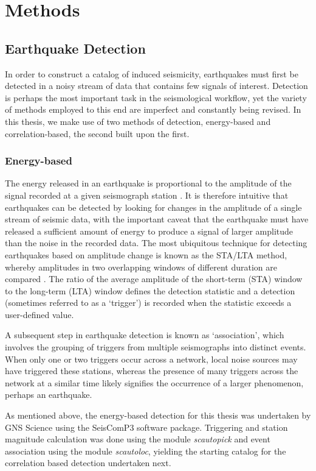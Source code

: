 \section{Methods}
\subsection{Earthquake Detection}
In order to construct a catalog of induced seismicity, earthquakes must first be detected in a noisy stream of data that contains few signals of interest. Detection is perhaps the most important task in the seismological workflow, yet the variety of methods employed to this end are imperfect and constantly being revised. In this thesis, we make use of two methods of detection, energy-based and correlation-based, the second built upon the first.

\subsubsection{Energy-based}\label{STA/LTA}
The energy released in an earthquake is proportional to the amplitude of the signal recorded at a given seismograph station \citep{stein_2000}. It is therefore intuitive that earthquakes can be detected by looking for changes in the amplitude of a single stream of seismic data, with the important caveat that the earthquake must have released a sufficient amount of energy to produce a signal of larger amplitude than the noise in the recorded data. The most ubiquitous technique for detecting earthquakes based on amplitude change is known as the STA/LTA method, whereby amplitudes in two overlapping windows of different duration are compared \citep{withers1998comparison}. The ratio of the average amplitude of the short-term (STA) window to the long-term (LTA) window defines the detection statistic and a detection (sometimes referred to as a `trigger') is recorded when the statistic exceeds a user-defined value.

A subsequent step in earthquake detection is known as `association', which involves the grouping of triggers from multiple seismographs into distinct events. When only one or two triggers occur across a network, local noise sources may have triggered these stations, whereas the presence of many triggers across the network at a similar time likely signifies the occurrence of a larger phenomenon, perhaps an earthquake.

As mentioned above, the energy-based detection for this thesis was undertaken by GNS Science using the SeisComP3 software package. Triggering and station magnitude calculation was done using the module \textit{scautopick} and event association using the module \textit{scautoloc}, yielding the starting catalog for the correlation based detection undertaken next.

